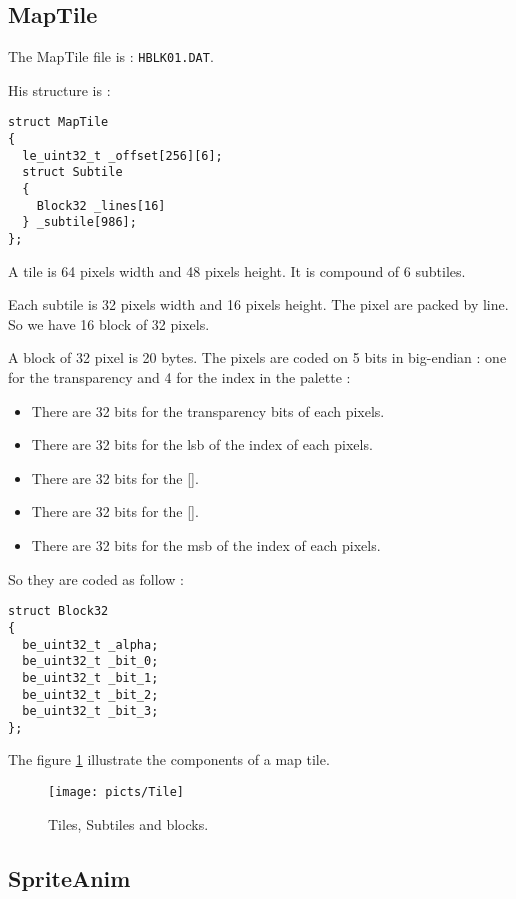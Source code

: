 \documentclass[a4paper,twoside,12pt,dvips]{article}
\begin{document}
\subsection{MapTile}
\label{sec:maptile}

The MapTile file is : \texttt{HBLK01.DAT}.

His structure is :

\begin{lstlisting}
struct MapTile
{
  le_uint32_t _offset[256][6];
  struct Subtile
  {
    Block32 _lines[16]
  } _subtile[986];
};
\end{lstlisting}

A tile is 64 pixels width and 48 pixels height. It is compound of 6 subtiles.

Each subtile is 32 pixels width and 16 pixels height. The pixel are packed by line. So we have 16 block of 32 pixels.

A block of 32 pixel is 20 bytes. The pixels are coded on 5 bits in big-endian : one for the transparency and 4 for the index in the palette :
\begin{itemize}
\item There are 32 bits for the transparency bits of each pixels.
\item There are 32 bits for the lsb of the index of each pixels.
\item There are 32 bits for the [].
\item There are 32 bits for the [].
\item There are 32 bits for the msb of the index of each pixels.
\end{itemize}
So they are coded as follow :
\begin{lstlisting}
struct Block32
{
  be_uint32_t _alpha;
  be_uint32_t _bit_0;
  be_uint32_t _bit_1;
  be_uint32_t _bit_2;
  be_uint32_t _bit_3;
};
\end{lstlisting}

The figure \ref{fig:maptile} illustrate the components of a map tile.

\begin{figure}[htbp]
  \texttt{[image: picts/Tile]}\centering 
  \caption{Tiles, Subtiles and blocks.}
  \label{fig:maptile}
\end{figure}

\subsection{SpriteAnim}
\label{sec:spriteanim}
\end{document}
